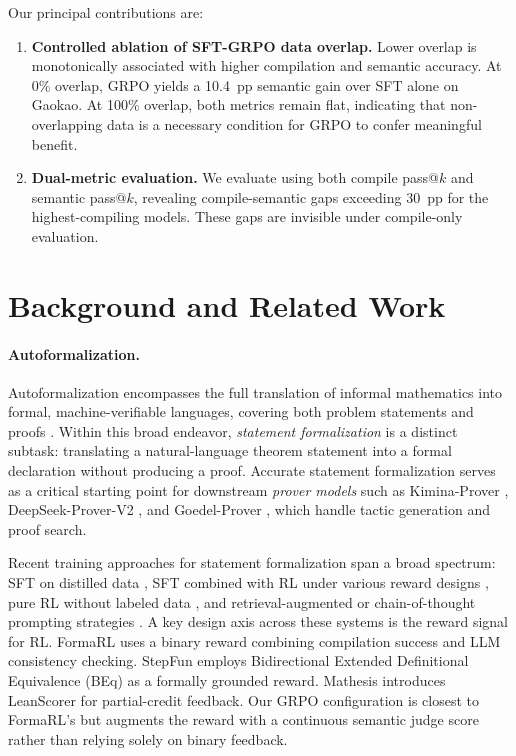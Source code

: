\documentclass[11pt,a4paper]{article}
\begin{document}
Our principal contributions are:
\begin{enumerate}[leftmargin=*, itemsep=3pt]
  \item \textbf{Controlled ablation of SFT-GRPO data overlap.} Lower overlap is monotonically associated with higher compilation and semantic accuracy. At 0\% overlap, GRPO yields a 10.4~pp semantic gain over SFT alone on Gaokao. At 100\% overlap, both metrics remain flat, indicating that non-overlapping data is a necessary condition for GRPO to confer meaningful benefit.

  \item \textbf{Dual-metric evaluation.} We evaluate using both compile pass@$k$ and semantic pass@$k$, revealing compile-semantic gaps exceeding 30~pp for the highest-compiling models. These gaps are invisible under compile-only evaluation.
\end{enumerate}

\section{Background and Related Work}\label{sec:related}

\paragraph{Autoformalization.}
Autoformalization encompasses the full translation of informal mathematics into formal, machine-verifiable languages, covering both problem statements and proofs \citep{wu2022autoformalization, weng2025autoformalization}. Within this broad endeavor, \emph{statement formalization} is a distinct subtask: translating a natural-language theorem statement into a formal declaration without producing a proof. Accurate statement formalization serves as a critical starting point for downstream \emph{prover models} such as Kimina-Prover \citep{wang2025kimina}, DeepSeek-Prover-V2 \citep{xin2025deepseekprover}, and Goedel-Prover \citep{lin2025goedelprover}, which handle tactic generation and proof search.

Recent training approaches for statement formalization span a broad spectrum: SFT on distilled data \citep{wang2025kimina}, SFT combined with RL under various reward designs \citep{zhang2025mathesis, wu2025stepfun}, pure RL without labeled data \citep{huang2025formalrl}, and retrieval-augmented or chain-of-thought prompting strategies \citep{weng2025autoformalization}. A key design axis across these systems is the reward signal for RL. FormaRL \citep{huang2025formalrl} uses a binary reward combining compilation success and LLM consistency checking. StepFun \citep{wu2025stepfun} employs Bidirectional Extended Definitional Equivalence (BEq) as a formally grounded reward. Mathesis \citep{zhang2025mathesis} introduces LeanScorer for partial-credit feedback. Our GRPO configuration is closest to FormaRL's but augments the reward with a continuous semantic judge score rather than relying solely on binary feedback.
\end{document}
